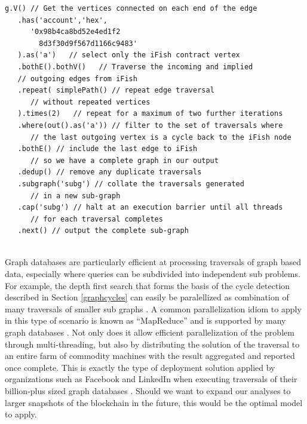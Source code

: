 \documentclass[conference]{IEEEtran}
\begin{document}
\begin{lstlisting}[basicstyle=\tiny]
   g.V() // Get the vertices connected on each end of the edge
   .has('account','hex',
      '0x98b4ca8bd52e4ed1f2
        8d3f30d9f567d1166c9483'
   ).as('a')   // select only the iFish contract vertex
   .bothE().bothV()   // Traverse the incoming and implied 
   // outgoing edges from iFish 
   .repeat( simplePath() // repeat edge traversal 
      // without repeated vertices
   ).times(2)   // repeat for a maximum of two further iterations
   .where(out().as('a')) // filter to the set of traversals where
      // the last outgoing vertex is a cycle back to the iFish node
   .bothE() // include the last edge to iFish 
      // so we have a complete graph in our output
   .dedup() // remove any duplicate traversals
   .subgraph('subg') // collate the traversals generated 
      // in a new sub-graph
   .cap('subg') // halt at an execution barrier until all threads
      // for each traversal completes
   .next() // output the complete sub-graph
    
\end{lstlisting}





Graph databases are particularly efficient at processing traversals of graph based data, especially where queries can be subdivided into independent sub problems.  For example, the depth first search that forms the basis of the cycle detection described in Section \ref{graphcycles} can easily be paralellized as combination of many traversals of smaller sub graphs \cite{cormen2009introduction}.  A common parallelization idiom to apply in this type of scenario is known as ``MapReduce'' \cite{dean2008mapreduce} and is supported by many graph databases \cite{navarro2014graphdb}.  Not only does it allow efficient parallelization of the problem through multi-threading,  but also  by distributing the solution of the traversal to an entire farm of commodity machines with the result aggregated and reported once complete.  This is exactly the type of deployment solution applied by organizations such as Facebook and LinkedIn when executing traversals of their billion-plus sized graph databases \cite{shimpi2012overview}.  Should we want to expand our analyses to larger snapshots of the blockchain in the future, this would be the optimal model to apply. 
\end{document}
